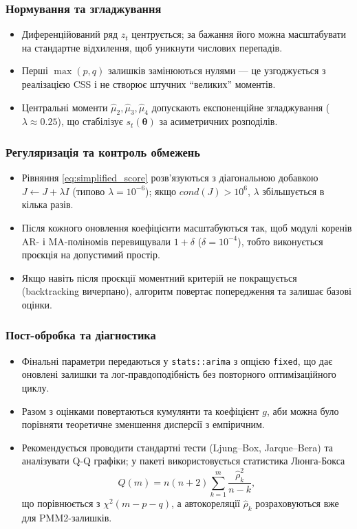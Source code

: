 \documentclass[12pt,a4paper]{article}
\begin{document}
\subsubsection{Нормування та згладжування}

\begin{itemize}
    \item Диференційований ряд $z_t$ центрується; за бажання його можна масштабувати на стандартне відхилення, щоб уникнути числових перепадів.
    \item Перші $\max(p,q)$ залишків замінюються нулями --- це узгоджується з реалізацією CSS і не створює штучних ``великих'' моментів.
    \item Центральні моменти $\hat{\mu}_2,\hat{\mu}_3,\hat{\mu}_4$ допускають експоненційне згладжування ($\lambda \approx 0.25$), що стабілізує $s_t(\boldsymbol{\theta})$ за асиметричних розподілів.
\end{itemize}

\subsubsection{Регуляризація та контроль обмежень}

\begin{itemize}
    \item Рівняння \eqref{eq:simplified_score} розв'язуються з діагональною добавкою $J \leftarrow J + \lambda I$ (типово $\lambda=10^{-6}$); якщо $cond(J)>10^6$, $\lambda$ збільшується в кілька разів.
    \item Після кожного оновлення коефіцієнти масштабуються так, щоб модулі коренів AR- і MA-поліномів перевищували $1+\delta$ ($\delta = 10^{-4}$), тобто виконується проєкція на допустимий простір.
    \item Якщо навіть після проєкції моментний критерій не покращується (backtracking вичерпано), алгоритм повертає попередження та залишає базові оцінки.
\end{itemize}

\subsubsection{Пост-обробка та діагностика}

\begin{itemize}
    \item Фінальні параметри передаються у \texttt{stats::arima} з опцією \texttt{fixed}, що дає оновлені залишки та лог-правдоподібність без повторного оптимізаційного циклу.
    \item Разом з оцінками повертаються кумулянти та коефіцієнт $g$, аби можна було порівняти теоретичне зменшення дисперсії з емпіричним.
    \item Рекомендується проводити стандартні тести (Ljung--Box, Jarque--Bera) та аналізувати Q-Q графіки; у пакеті використовується статистика Люнга-Бокса
    \begin{equation}
    \label{eq:ljung_box}
    Q(m) = n(n+2) \sum_{k=1}^{m} \frac{\hat{\rho}_k^2}{n-k},
    \end{equation}
    що порівнюється з $\chi^2(m - p - q)$, а автокореляції $\hat{\rho}_k$ розраховуються вже для PMM2-залишків.
\end{itemize}
\end{document}
